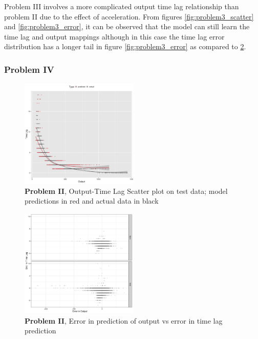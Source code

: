 \documentclass[twoside]{article}
\begin{document}
Problem III involves a more complicated output time lag relationship than problem II due to the effect of acceleration. From figures \ref{fig:problem3_scatter} and \ref{fig:problem3_error}, it can be observed that the model can still learn the time lag and output mappings although in this case the time lag error distribution has a longer tail in figure \ref{fig:problem3_error} as compared to \ref{fig:problem2_error}.

\subsubsection{Problem IV}


\begin{figure}[h]
\vspace{.3in}
\centerline{\includegraphics[width=0.5\textwidth]{figures/exp2_scatter_v_tl.png}}
\vspace{.3in}
\caption{\textbf{Problem II}, Output-Time Lag Scatter plot on test data; model predictions in red and actual data in black}
\label{fig:problem2_scatter}
\end{figure}

\begin{figure}[h]
\vspace{.3in}
\centerline{\includegraphics[width=0.5\textwidth]{figures/exp2_scatter_errors_test.png}}
\vspace{.3in}
\caption{\textbf{Problem II}, Error in prediction of output vs error in time lag prediction}
\label{fig:problem2_error}
\end{figure}
\end{document}
